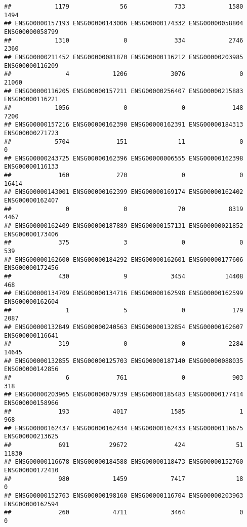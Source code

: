 \documentclass[
]{article}
\begin{document}
\begin{verbatim}
##            1179              56             733            1580            1494 
## ENSG00000157193 ENSG00000143006 ENSG00000174332 ENSG00000058804 ENSG00000058799 
##            1310               0             334            2746            2360 
## ENSG00000211452 ENSG00000081870 ENSG00000116212 ENSG00000203985 ENSG00000116209 
##               4            1206            3076               0           21060 
## ENSG00000116205 ENSG00000157211 ENSG00000256407 ENSG00000215883 ENSG00000116221 
##            1056               0               0             148            7200 
## ENSG00000157216 ENSG00000162390 ENSG00000162391 ENSG00000184313 ENSG00000271723 
##            5704             151              11               0               0 
## ENSG00000243725 ENSG00000162396 ENSG00000006555 ENSG00000162398 ENSG00000116133 
##             160             270               0               0           16414 
## ENSG00000143001 ENSG00000162399 ENSG00000169174 ENSG00000162402 ENSG00000162407 
##               0               0              70            8319            4467 
## ENSG00000162409 ENSG00000187889 ENSG00000157131 ENSG00000021852 ENSG00000173406 
##             375               3               0               0             539 
## ENSG00000162600 ENSG00000184292 ENSG00000162601 ENSG00000177606 ENSG00000172456 
##             430               9            3454           14408             468 
## ENSG00000134709 ENSG00000134716 ENSG00000162598 ENSG00000162599 ENSG00000162604 
##               1               5               0             179            2087 
## ENSG00000132849 ENSG00000240563 ENSG00000132854 ENSG00000162607 ENSG00000116641 
##             319               0               0            2284           14645 
## ENSG00000132855 ENSG00000125703 ENSG00000187140 ENSG00000088035 ENSG00000142856 
##               6             761               0             903             318 
## ENSG00000203965 ENSG00000079739 ENSG00000185483 ENSG00000177414 ENSG00000158966 
##             193            4017            1585               1             968 
## ENSG00000162437 ENSG00000162434 ENSG00000162433 ENSG00000116675 ENSG00000213625 
##             691           29672             424              51           11830 
## ENSG00000116678 ENSG00000184588 ENSG00000118473 ENSG00000152760 ENSG00000172410 
##             980            1459            7417              18               0 
## ENSG00000152763 ENSG00000198160 ENSG00000116704 ENSG00000203963 ENSG00000162594 
##             260            4711            3464               0               0 

\end{verbatim}
\end{document}
